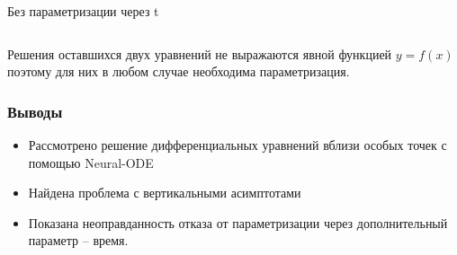 \documentclass[8pt]{beamer}
\newcommand\FontUP{\fontsize{12}{14}\selectfont}
\begin{document}
\begin{frame}
\begin{block}{Без параметризации через t}
\begin{columns}
\begin{column}{0.5\textwidth}
\begin{center}
				\end{center}
			\end{column}
		\end{columns}
	Решения оставшихся двух уравнений не выражаются явной функцией $y = f(x)$ поэтому для них в любом случае необходима параметризация. 
	\end{block}

\end{frame}

\begin{frame}
	\frametitle{Выводы}
	\FontUP
	\begin{itemize}
		\item Рассмотрено решение дифференциальных уравнений вблизи особых точек с помощью Neural-ODE
		\vfill
		\item Найдена проблема с вертикальными асимптотами
		\vfill
		\item Показана неоправданность отказа от параметризации через дополнительный параметр -- время.
	\end{itemize}		
\end{frame}
\end{document}
